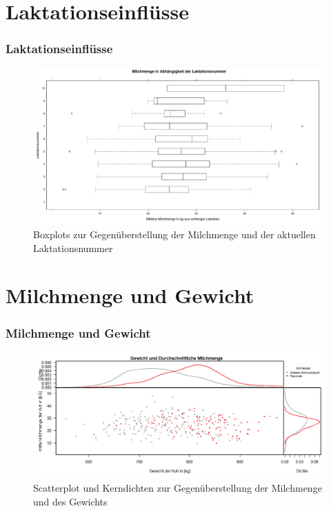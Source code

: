 \documentclass{beamer}
\begin{document}
	\section{Laktationseinflüsse}
	\begin{frame}
		\frametitle{Laktationseinflüsse}
		\begin{figure}[htbp]
			\centering
			\includegraphics[scale = 0.333]{lattice.pdf}
			\vspace{-0.6cm}
			\caption{Boxplots zur Gegenüberstellung der Milchmenge und der aktuellen Laktationsnummer}
		\end{figure}
	\end{frame}

    	\section{Milchmenge und Gewicht}
	\begin{frame}
		\frametitle{Milchmenge und Gewicht}
		\begin{figure}[h]
			\centering
			\includegraphics[width=1\textwidth]{Scatter und Kerndichte Milchmenge~Gewicht.png}
			\vspace{-0.6cm}
			\caption{Scatterplot und Kerndichten zur Gegenüberstellung der Milchmenge und des Gewichts}
		\end{figure}
	\end{frame}
\end{document}
